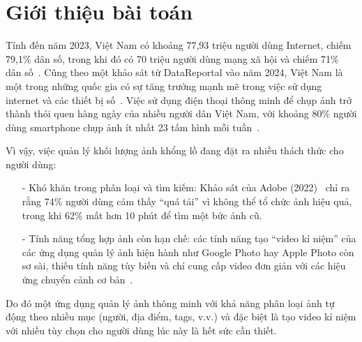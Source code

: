 \section{Giới thiệu bài toán}

Tính đến năm 2023, Việt Nam có khoảng 77,93 triệu người dùng Internet, chiếm 79,1\% dân số, trong khi đó có 70 triệu người dùng mạng xã hội và chiếm 71\% dân số~\cite{vnetwork2023}. Cũng theo một khảo sát từ DataReportal vào năm 2024, Việt Nam là một trong những quốc gia có sự tăng trưởng mạnh mẽ trong việc sử dụng internet và các thiết bị số~\cite{datareportal}. Việc sử dụng điện thoại thông minh để chụp ảnh trở thành thói quen hàng ngày của nhiều người dân Việt Nam, với khoảng 80\% người dùng smartphone chụp ảnh ít nhất 23 tấm hình mỗi tuần~\cite{qandme}.

Vì vậy, việc quản lý khối lượng ảnh khổng lồ đang đặt ra nhiều thách thức cho người dùng:
\begin{itemize}
	\item[-] Khó khăn trong phân loại và tìm kiếm: Khảo sát của Adobe (2022)~\cite{catchlight} chỉ ra rằng 74\% người dùng cảm thấy ``quá tải'' vì không thể tổ chức ảnh hiệu quả, trong khi 62\% mất hơn 10 phút để tìm một bức ảnh cũ.
	\item[-] Tính năng tổng hợp ảnh còn hạn chế: các tính năng tạo ``video kỉ niệm'' của các ứng dụng quản lý ảnh hiện hành như Google Photo hay Apple Photo còn sơ sài, thiếu tính năng tùy biến và chỉ cung cấp video đơn giản với các hiệu ứng chuyển cảnh cơ bản~\cite{usmobile}.
\end{itemize}

Do đó một ứng dụng quản lý ảnh thông minh với khả năng phân loại ảnh tự động theo nhiều mục (người, địa điểm, tags, v.v.) và đặc biệt là tạo video kỉ niệm với nhiều tùy chọn cho người dùng lúc này là hết sức cần thiết.


